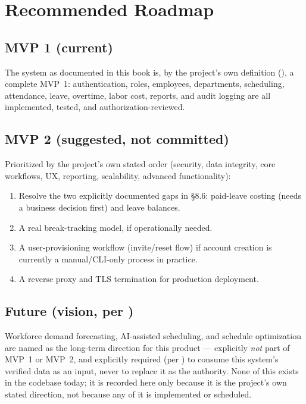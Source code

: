 \section{Recommended Roadmap}

\subsection*{MVP 1 (current)}

The system as documented in this book is, by the project's own
definition (), a complete MVP~1: authentication, roles,
employees, departments, scheduling, attendance, leave, overtime, labor
cost, reports, and audit logging are all implemented, tested, and
authorization-reviewed.

\subsection*{MVP 2 (suggested, not committed)}

Prioritized by the project's own stated order (security, data
integrity, core workflows, UX, reporting, scalability, advanced
functionality):

\begin{enumerate}[nosep]
  \item Resolve the two explicitly documented gaps in \S8.6: paid-leave
        costing (needs a business decision first) and leave balances.
  \item A real break-tracking model, if operationally needed.
  \item A user-provisioning workflow (invite/reset flow) if account
        creation is currently a manual/CLI-only process in practice.
  \item A reverse proxy and TLS termination for production deployment.
\end{enumerate}

\subsection*{Future (vision, per )}

Workforce demand forecasting, AI-assisted scheduling, and schedule
optimization are named as the long-term direction for this product ---
explicitly \emph{not} part of MVP~1 or MVP~2, and explicitly required
(per ) to consume this system's verified data as an
input, never to replace it as the authority. None of this exists in the
codebase today; it is recorded here only because it is the project's
own stated direction, not because any of it is implemented or
scheduled.
